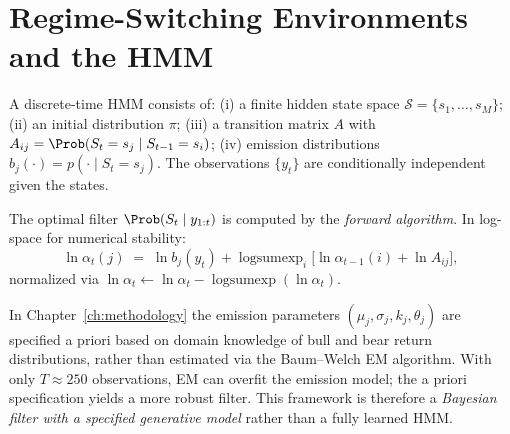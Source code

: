 \section{Regime-Switching Environments and the HMM}

\begin{definition}
A discrete-time HMM consists of:
(i) a finite hidden state space $\mathcal{S} = \{s_1,\ldots,s_M\}$;
(ii) an initial distribution $\pi$;
(iii) a transition matrix $A$ with $A_{ij} = \Prob(S_t = s_j \mid S_{t-1} = s_i)$;
(iv) emission distributions $b_j(\cdot) = p(\cdot \mid S_t = s_j)$.
The observations $\{y_t\}$ are conditionally independent given the states.
\end{definition}

The optimal filter $\Prob(S_t \mid y_{1:t})$ is computed by the
\emph{forward algorithm}.  In log-space for numerical stability:
\begin{equation}
    \ln\alpha_t(j) \;=\; \ln b_j(y_t)
    + \operatorname{logsumexp}_i\!\bigl[\ln\alpha_{t-1}(i) + \ln A_{ij}\bigr],
    \label{eq:forward_logspace}
\end{equation}
normalized via $\ln\alpha_t \leftarrow \ln\alpha_t - \operatorname{logsumexp}(\ln\alpha_t)$.

\begin{remark}
\label{rem:hmm_specified}
In Chapter~\ref{ch:methodology} the emission parameters
$(\mu_j, \sigma_j, k_j, \theta_j)$ are specified a priori based on domain
knowledge of bull and bear return distributions, rather than estimated via
the Baum--Welch EM algorithm.  With only $T \approx 250$ observations,
EM can overfit the emission model; the a priori specification yields a more
robust filter.  This framework is therefore a \emph{Bayesian filter with a
specified generative model} rather than a fully learned HMM.
\end{remark}
